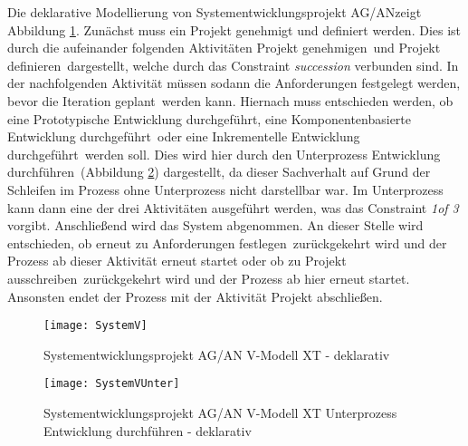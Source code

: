 {Die deklarative Modellierung von \grqq Systementwicklungsprojekt AG/AN\grqq  zeigt Abbildung \ref{fig:SystemV}. \newline
Zunächst muss ein Projekt genehmigt und definiert werden. Dies ist durch die aufeinander folgenden Aktivitäten \grqq Projekt genehmigen\grqq \ und \grqq Projekt definieren\grqq \ dargestellt, welche durch das Constraint \textit{succession} verbunden sind.\newline
In der nachfolgenden Aktivität müssen sodann die \grqq Anforderungen festgelegt werden\grqq, bevor die \grqq Iteration geplant\grqq \ werden kann. \newline
Hiernach muss entschieden werden, ob eine \grqq Prototypische Entwicklung durchgeführt\grqq, eine \grqq Komponentenbasierte Entwicklung durchgeführt\grqq \ oder eine \grqq Inkrementelle Entwicklung durchgeführt\grqq \ werden soll. Dies wird hier durch den Unterprozess \grqq Entwicklung durchführen\grqq \ (Abbildung \ref{fig:SystemVUnter}) dargestellt, da dieser Sachverhalt auf Grund der Schleifen im Prozess ohne Unterprozess nicht darstellbar war. Im Unterprozess kann dann eine der drei Aktivitäten ausgeführt werden, was das Constraint \textit{1of 3} vorgibt.\newline
Anschließend wird das \grqq System abgenommen\grqq.
An dieser Stelle wird entschieden, ob erneut zu \grqq Anforderungen festlegen\grqq \ zurückgekehrt wird und der Prozess ab dieser Aktivität erneut startet oder ob zu \grqq Projekt ausschreiben\grqq \ zurückgekehrt wird und der Prozess ab hier erneut startet. Ansonsten endet der Prozess mit der Aktivität \grqq Projekt abschließen\grqq.

\begin{figure}[!htbp]
\begin{center}
  \texttt{[image: SystemV]} %
  \caption{Systementwicklungsprojekt AG/AN  V-Modell XT - deklarativ}
  \label{fig:SystemV}
\end{center}
\end{figure}

\begin{figure}[!htbp]
\begin{center}
  \texttt{[image: SystemVUnter]} %
  \caption{Systementwicklungsprojekt AG/AN  V-Modell XT Unterprozess Entwicklung durchführen - deklarativ}
  \label{fig:SystemVUnter}
\end{center}
\end{figure}



}
